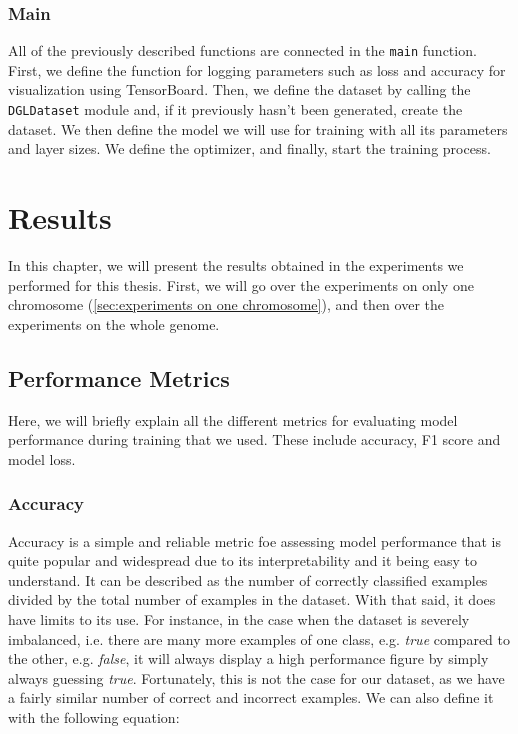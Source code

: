 \documentclass[times, utf8, diplomski, english]{fer_eng}
\begin{document}
\subsection{Main}

All of the previously described functions are connected in the \texttt{main} function. First, we define the function for logging parameters such as loss and accuracy for visualization using TensorBoard. Then, we define the dataset by calling the \texttt{DGLDataset} module and, if it previously hasn't been generated, create the dataset. We then define the model we will use for training with all its parameters and layer sizes. We define the optimizer, and finally, start the training process.


\chapter{Results}

In this chapter, we will present the results obtained in the experiments we performed for this thesis. First, we will go over the experiments on only one chromosome (\ref{sec:experiments on one chromosome}), and then over the experiments on the whole genome.

\section{Performance Metrics}

Here, we will briefly explain all the different metrics for evaluating model performance during training that we used. These include accuracy, F1 score and model loss.

\subsection{Accuracy}

Accuracy is a simple and reliable metric foe assessing model performance that is quite popular and widespread due to its interpretability and it being easy to understand. It can be described as the number of correctly classified examples divided by the total number of examples in the dataset. With that said, it does have limits to its use. For instance, in the case when the dataset is severely imbalanced, i.e. there are many more examples of one class, e.g. \textit{true} compared to the other, e.g. \textit{false}, it will always display a high performance figure by simply always guessing \textit{true}. Fortunately, this is not the case for our dataset, as we have a fairly similar number of correct and incorrect examples. We can also define it with the following equation:
\end{document}
